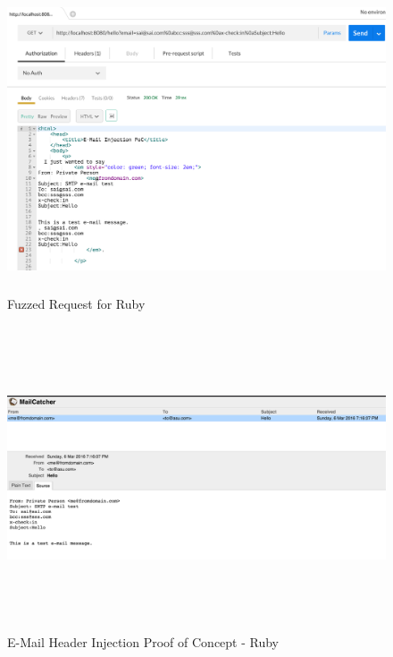 \begin{figure}[!htbp]
	\centering
	\includegraphics[width=14cm, height=9cm]{System/EMI_Postman_Ruby}
	\caption{Fuzzed Request for Ruby}
	\label{fig:postmanruby}
\end{figure}

\begin{figure}[!htbp]
	\centering
	\includegraphics[width=14cm, height=9cm]{System/EMI_Mailcatcher_Ruby}
	\caption{E-Mail Header Injection Proof of Concept - Ruby}
	\label{fig:mailcatcherruby}
\end{figure}

